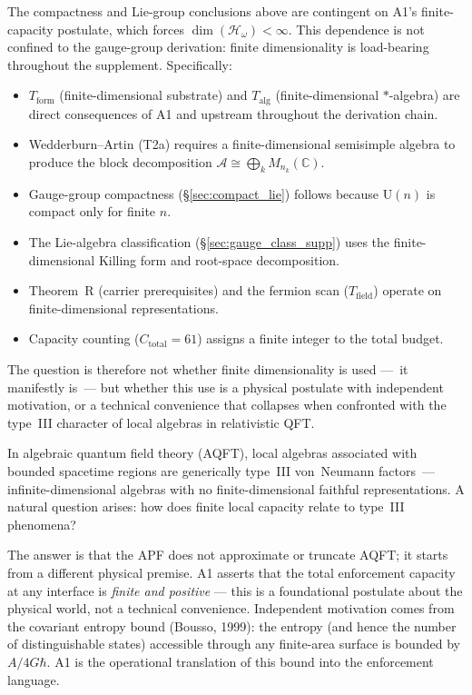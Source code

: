 \documentclass[11pt,a4paper]{article}
\theoremstyle{definition}
\begin{document}
The compactness and Lie-group conclusions above are contingent on A1's
finite-capacity postulate, which forces $\dim(\mathcal{H}_\omega) < \infty$.
This dependence is not confined to the gauge-group derivation: finite
dimensionality is load-bearing throughout the supplement.  Specifically:
\begin{itemize}[nosep]
  \item $T_{\mathrm{form}}$ (finite-dimensional substrate) and
  $T_{\mathrm{alg}}$ (finite-dimensional $*$-algebra) are direct
  consequences of A1 and upstream throughout the derivation chain.
  \item Wedderburn--Artin (T2a) requires a finite-dimensional semisimple
  algebra to produce the block decomposition
  $\mathcal{A} \cong \bigoplus_k M_{n_k}(\mathbb{C})$.
  \item Gauge-group compactness (\S\ref{sec:compact_lie}) follows because
  $\mathrm{U}(n)$ is compact only for finite $n$.
  \item The Lie-algebra classification
  (\S\ref{sec:gauge_class_supp}) uses the finite-dimensional Killing
  form and root-space decomposition.
  \item Theorem~R (carrier prerequisites) and the fermion scan
  ($T_{\mathrm{field}}$) operate on finite-dimensional representations.
  \item Capacity counting ($C_{\mathrm{total}} = 61$) assigns a finite
  integer to the total budget.
\end{itemize}
The question is therefore not whether finite dimensionality is used
---~it manifestly is~--- but whether this use is a physical postulate
with independent motivation, or a technical convenience that collapses
when confronted with the type~III character of local algebras in
relativistic QFT.

In algebraic quantum field theory (AQFT), local algebras associated
with bounded spacetime regions are generically type~III von~Neumann
factors~--- infinite-dimensional algebras with no finite-dimensional
faithful representations.  A natural question arises: how does finite
local capacity relate to type~III phenomena?

The answer is that the APF does not approximate or truncate AQFT; it
starts from a different physical premise.  A1 asserts that the total
enforcement capacity at any interface is \emph{finite and positive} ---
this is a foundational postulate about the physical world, not a
technical convenience.  Independent motivation comes from the covariant
entropy bound (Bousso, 1999): the entropy (and hence the number of
distinguishable states) accessible through any finite-area surface is
bounded by $A / 4G\hbar$.  A1 is the operational translation of this
bound into the enforcement language.
\end{document}
